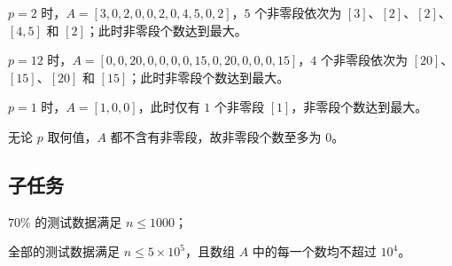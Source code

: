$p = 2$ 时，$A = [3, 0, 2, 0, 0, 2, 0, 4, 5, 0, 2]$，$5$ 个非零段依次为 $[3]$、$[2]$、$[2]$、$[4, 5]$ 和 $[2]$；此时非零段个数达到最大。

\examplebox*{}{}

$p = 12$ 时，$A = [0, 0, 20, 0, 0, 0, 0, 15, 0, 20, 0, 0, 0, 15]$，$4$ 个非零段依次为 $[20]$、$[15]$、$[20]$ 和 $[15]$；此时非零段个数达到最大。

\examplebox*{}{}

$p = 1$ 时，$A = [1, 0, 0]$，此时仅有 $1$ 个非零段 $[1]$，非零段个数达到最大。

\examplebox*{}{}

无论 $p$ 取何值，$A$ 都不含有非零段，故非零段个数至多为 $0$。

\subsection*{子任务}

$70\%$ 的测试数据满足 $n \le 1000$；

全部的测试数据满足 $n \le 5 \times 10^{5}$，且数组 $A$ 中的每一个数均不超过 $10^{4}$。


